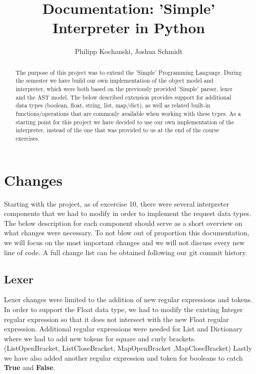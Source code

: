 \documentclass{article}
\begin{document}
\title{Documentation: 'Simple' Interpreter in Python}
\author{Philipp Kochanski, Joshua Schmidt}

\maketitle

\begin{abstract}
The purpose of this project was to extend the 'Simple' Programming Language.
During the semester we have build our own implementation of the object model and interpreter, which were both based
on the previously provided 'Simple' parser, lexer and the AST model. The below described extension provides support for additional data types (boolean, float, string, list, map/dict), as well as related built-in functions/operations that are commonly available when working with these types. As a starting point for this project we have decided to use our own implementation of the interpreter, instead of the one that was provided to us at the end of the course exercises. 
\end{abstract}

\section{Changes}
Starting with the project, as of excercise 10, there were several interpreter components that we had to modify in order to implement the request data types. The below description for each component should serve as a short overview on what changes were necessary. To not blow out of proportion this documentation, we will focus on the most important changes and we will not discuss every new line of code. A full change list can be obtained following our git commit history.

\subsection{Lexer}
Lexer changes were limited to the addition of new regular expressions and tokens. In order to support the Float data type, we had to modify the existing Integer regular expression so that it does not intersect with the new Float regular expression. Additional regular expressions were needed for List and Dictionary where we had to add new tokens for square and curly brackets. (ListOpenBracket, ListCloseBracket, MapOpenBracket ,MapCloseBracket) Lastly we have also added another regular expression and token for booleans to catch \textbf{True} and \textbf{False}.
\end{document}
